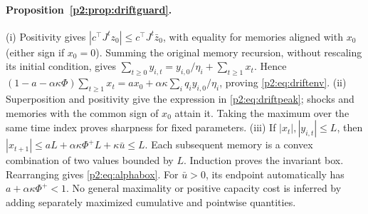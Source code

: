 \paragraph{Proposition~\ref{p2:prop:driftguard}.} (i) Positivity gives $|c^\top J^tz_0|\le c^\top J^t\bar z_0$, with equality for memories aligned with $x_0$ (either sign if $x_0=0$). Summing the original memory recursion, without rescaling its initial condition, gives $\sum_{t\ge0}y_{i,t}=y_{i,0}/\eta_i+\sum_{t\ge1}x_t$. Hence $(1-a-\alpha\kappa\Phi)\sum_{t\ge1}x_t=ax_0+\alpha\kappa\sum_iq_iy_{i,0}/\eta_i$, proving \eqref{p2:eq:driftenv}. (ii) Superposition and positivity give the expression in \eqref{p2:eq:driftpeak}; shocks and memories with the common sign of $x_0$ attain it. Taking the maximum over the same time index proves sharpness for fixed parameters. (iii) If $|x_t|,|y_{i,t}|\le L$, then $|x_{t+1}|\le aL+\alpha\kappa\Phi^+L+\kappa\bar u\le L$. Each subsequent memory is a convex combination of two values bounded by $L$. Induction proves the invariant box. Rearranging gives \eqref{p2:eq:alphabox}. For $\bar u>0$, its endpoint automatically has $a+\alpha\kappa\Phi^+<1$. No general maximality or positive capacity cost is inferred by adding separately maximized cumulative and pointwise quantities.

